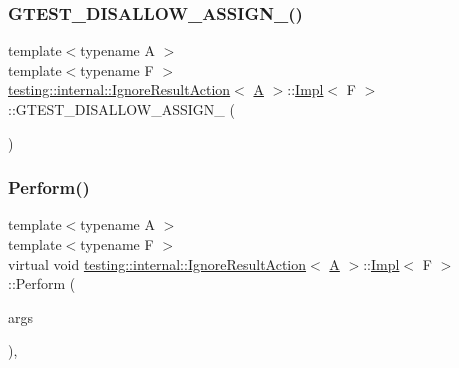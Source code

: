 \subsubsection{\texorpdfstring{G\+T\+E\+S\+T\+\_\+\+D\+I\+S\+A\+L\+L\+O\+W\+\_\+\+A\+S\+S\+I\+G\+N\+\_\+()}{GTEST\_DISALLOW\_ASSIGN\_()}}
{\footnotesize\ttfamily template$<$typename A $>$ \\
template$<$typename F $>$ \\
\hyperlink{classtesting_1_1internal_1_1IgnoreResultAction}{testing\+::internal\+::\+Ignore\+Result\+Action}$<$ \hyperlink{namespacetesting_a5e9134d655d2fc9323902348083282e7}{A} $>$\+::\hyperlink{classtesting_1_1internal_1_1IgnoreResultAction_1_1Impl}{Impl}$<$ F $>$\+::G\+T\+E\+S\+T\+\_\+\+D\+I\+S\+A\+L\+L\+O\+W\+\_\+\+A\+S\+S\+I\+G\+N\+\_\+ (\begin{DoxyParamCaption}\item[{\hyperlink{classtesting_1_1internal_1_1IgnoreResultAction_1_1Impl}{Impl}$<$ F $>$}]{ }\end{DoxyParamCaption})\hspace{0.3cm}{\ttfamily [private]}}

\mbox{\label{classtesting_1_1internal_1_1IgnoreResultAction_1_1Impl_ad2b7d520f2d50cf640da1a039a81684f}} 
\subsubsection{\texorpdfstring{Perform()}{Perform()}}
{\footnotesize\ttfamily template$<$typename A $>$ \\
template$<$typename F $>$ \\
virtual void \hyperlink{classtesting_1_1internal_1_1IgnoreResultAction}{testing\+::internal\+::\+Ignore\+Result\+Action}$<$ \hyperlink{namespacetesting_a5e9134d655d2fc9323902348083282e7}{A} $>$\+::\hyperlink{classtesting_1_1internal_1_1IgnoreResultAction_1_1Impl}{Impl}$<$ F $>$\+::Perform (\begin{DoxyParamCaption}\item[{const \hyperlink{classtesting_1_1ActionInterface_af72720d864da4d606629e83edc003511}{Argument\+Tuple} \&}]{args }\end{DoxyParamCaption})\hspace{0.3cm}{\ttfamily [inline]}, {\ttfamily [virtual]}}



